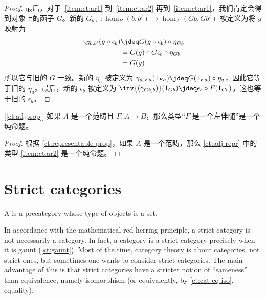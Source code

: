 \begin{proof}
  最后，对于~\ref{item:ct:ar1} 到~\ref{item:ct:ar2} 再到~\ref{item:ct:ar1}，我们肯定会得到对象上的函子 $G$。新的 $G_{b,b'}:\hom_B(b,b') \to \hom_A(Gb,Gb')$ 被定义为将 $g$ 映射为
  \begin{align*}
    \gamma_{G b, b'}(g \circ \epsilon_b)
    &\jdeq G(g \circ \epsilon_b) \circ \eta_{Gb}\\
    &= G(g) \circ G\epsilon_b \circ \eta_{Gb}\\
    &= G(g)
  \end{align*}
  所以它与旧的 $G$ 一致。新的 $\eta_a$ 被定义为 $\gamma_{a,Fa}(1_{Fa}) \jdeq G(1_{Fa}) \circ \eta_a$，因此它等于旧的 $\eta_a$。最后，新的 $\epsilon_b$ 被定义为 $\inv{(\gamma_{Gb,b})}(1_{Gb}) \jdeq \epsilon_b \circ F(1_{Gb})$，这也等于旧的 $\epsilon_b$。
\end{proof}

\begin{cor}\label{ct:adjprop2}[\cref{ct:adjprop}]
如果 $A$ 是一个范畴且 $F:A\to B$，那么类型“$F$ 是一个左伴随”是一个纯命题。
\end{cor}
\begin{proof}
  根据 \cref{ct:representable-prop}，如果 $A$ 是一个范畴，那么 \cref{ct:adj-repr} 中的类型 \ref{item:ct:ar2} 是一个纯命题。
\end{proof}


\section{Strict categories}
\label{sec:strict-categories}

%

\begin{defn}\label{ct:strict-category}
  A 
  is a precategory whose type of objects is a set.
\end{defn}

In accordance with the mathematical red herring principle, a strict category is not necessarily a category.
In fact, a category is a strict category precisely when it is gaunt (\cref{ct:gaunt}).
%
%
Most of the time, category theory is about categories, not strict ones, but sometimes one wants to consider strict categories.
The main advantage of this is that strict categories have a stricter notion of ``sameness'' than equivalence, namely isomorphism (or equivalently, by \cref{ct:cat-eq-iso}, equality).

